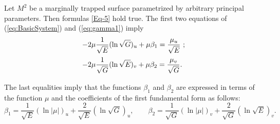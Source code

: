 \documentclass[12pt]{amsart}
\theoremstyle{definition}
\theoremstyle{remark}
\newcommand{\ds}{\displaystyle}
\numberwithin{equation}{section}
\begin{document}
Let $M^2$ be a marginally trapped surface parametrized by arbitrary principal parameters. Then formulas \eqref{Eq-5} hold true.
The first two equations of  (\ref{eq:BasicSystem}) and  (\ref{eq:gamma1}) imply 
\begin{equation*} \label{eq:3.1a}
	\begin{array}{l}
		\vspace{2mm}
		\ds -2\mu\frac{1}{\sqrt{E}}(\ln \sqrt{ G})_u+\mu\beta_1=\frac{\mu_u}{\sqrt E} \ ; \\
		\vspace{2mm}
		\ds	-2\mu\frac{1}{\sqrt{G}}(\ln \sqrt{ E})_v+\mu\beta_2=\frac{\mu_v}{\sqrt G}.
	\end{array}
\end{equation*}
The last equalities imply that the functions $\beta_1$ and $\beta_2$ are expressed in terms of the function $\mu$ and the coefficients of the first fundamental form as follows:
\begin{equation} \label{eq:beta}
	\beta_1=\frac{1}{\sqrt E} (\ln |\mu|)_u + \frac{2}{\sqrt{E}}(\ln \sqrt{ G})_u,  \qquad \beta_2=\frac{1}{\sqrt G} (\ln |\mu|)_v + \frac{2}{\sqrt{G}}(\ln \sqrt{ E})_v.
\end{equation} 
\end{document}

